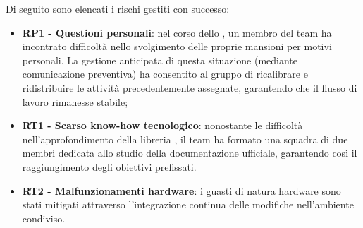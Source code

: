 \vspace{0.5\baselineskip}
\par Di seguito sono elencati i rischi gestiti con successo:
\begin{itemize}
  \item \textbf{RP1 - Questioni personali}: nel corso dello , un membro del team ha incontrato difficoltà nello svolgimento delle proprie mansioni per motivi personali. La gestione anticipata di questa situazione (mediante comunicazione preventiva) ha consentito al gruppo di ricalibrare e ridistribuire le attività precedentemente assegnate, garantendo che il flusso di lavoro rimanesse stabile;
  \item \textbf{RT1 - Scarso know-how tecnologico}: nonostante le difficoltà nell’approfondimento della libreria , il team ha formato una squadra di due membri dedicata allo studio della documentazione ufficiale, garantendo così il raggiungimento degli obiettivi prefissati.
  \item \textbf{RT2 - Malfunzionamenti hardware}: i guasti di natura hardware sono stati mitigati attraverso l’integrazione continua delle modifiche nell'ambiente condiviso.
\end{itemize}
